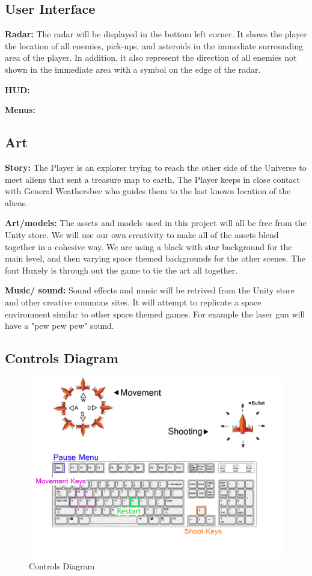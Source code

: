 \documentclass[12pt]{article}       %
\begin{document}
\subsection{User Interface} %

	{\bf Radar:} The radar will be displayed in the bottom left corner. It shows the player the location of all enemies, pick-ups, and asteroids in the immediate surrounding area of the player. In addition, it also represent the direction of all enemies not shown in the immediate area with a symbol on the edge of the radar.

	{\bf HUD:}

	{\bf Menus:}

\subsection{Art} %

	{\bf Story:} The Player is an explorer trying to reach the other side of the Universe to meet aliens that sent a treasure map to earth. The Player keeps in close contact with General Weathersbee who guides them to the last known location of the aliens. 

	{\bf Art/models:} The assets and models used in this project will all be free from the Unity store. We will use our own creativity to make all of the assets blend together in a cohesive way. We are using a black with star background for the main level, and then varying space themed backgrounds for the other scenes. The font Huxely is through out the game to tie the art all together.  

	{\bf Music/ sound:} Sound effects and music will be retrived from the Unity store and other creative commons sites. It will attempt to replicate a space environment similar to other space themed games. For example the laser gun will have a "pew pew pew" sound. 


\subsection{Controls Diagram}

\begin{figure} [H]
\centering
\includegraphics[width=6.3 in]{ControlDiagramFinal.png}
\caption{Controls Diagram} \label{Controls}
\end{figure}
\end{document}
